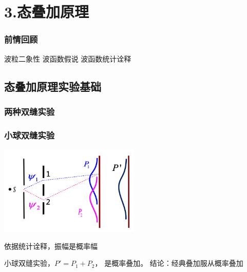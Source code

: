 \section{3.态叠加原理}

\begin{frame}
    \frametitle{前情回顾}
    \begin{itemize}
        \Item 波粒二象性
        \Item 波函数假说
        \Item 波函数统计诠释
    \end{itemize}
\end{frame}  

\subsection{态叠加原理实验基础}

\begin{frame}
    \frametitle{两种双缝实验}
        \begin{figure}
            \centering
        \end{figure}
    \setcounter{subfigure}{0}
\end{frame}

\begin{frame}
    \frametitle{小球双缝实验}
    \begin{center}
        \includegraphics[width=0.5\textwidth]{figs/sup-2.png} \\
    \end{center} 
    依据统计诠释，振幅是概率幅\\
    \begin{itemize}
        \Item 小球双缝实验，$P'=P_1+P_2 $， 是概率叠加。
        \Item 结论：经典叠加服从概率叠加
    \end{itemize}
\end{frame} 


